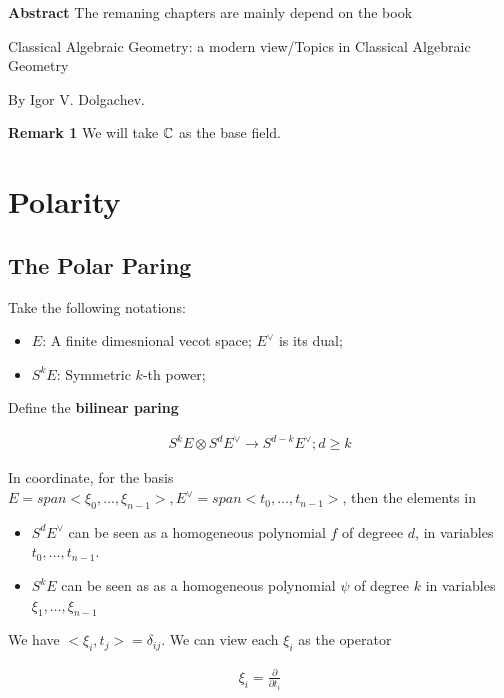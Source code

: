 \documentclass[Total.tex]{subfiles}
\begin{document}
	\newpage
	
	\textbf{Abstract} The remaning chapters are mainly depend on the book 
	
	\begin{center}
		Classical Algebraic Geometry: a modern
		view/Topics in Classical Algebraic Geometry
	\end{center}
	
	By Igor V. Dolgachev.
	
	\textbf{Remark 1} We will take $\mathbb{C}$ as the base field.
	
	\chapter{Polarity}
	
		\section{The Polar Paring}
		
		Take the following notations:
		
		\begin{itemize}
			\item $E$: A finite dimesnional vecot space; $E^\vee$ is its dual;
			\item $S^kE$: Symmetric $k$-th power; 
		\end{itemize}
	
		\begin{Def}
			Define the \textbf{bilinear paring}
			
			\begin{gather*}
				S^kE\otimes S^dE^\vee\rightarrow S^{d-k} E^\vee;d\geq k
			\end{gather*}
			
			In coordinate, for the basis $E=span<\xi_0,\dots,\xi_{n-1}>,E^\vee=span<t_0,\dots,t_{n-1}>$, then the elements in 
			
			\begin{itemize}
				\item $S^dE^\vee$ can be seen as a homogeneous polynomial $f$ of degreee $d$, in variables $t_0,\dots,t_{n-1}$. 
				
				\item $S^k E$ can be seen as as a homogeneous polynomial $\psi$ of degree $k$ in variables $\xi_1,\dots,\xi_{n-1}$
			\end{itemize}
			
			We have $<\xi_i,t_j>=\delta_{ij}$. We can view each $\xi_i$ as the operator
			
			\begin{gather*}
				\xi_i=\frac{\partial}{\partial t_i}
			\end{gather*}
		\end{Def}
		
\end{document}
